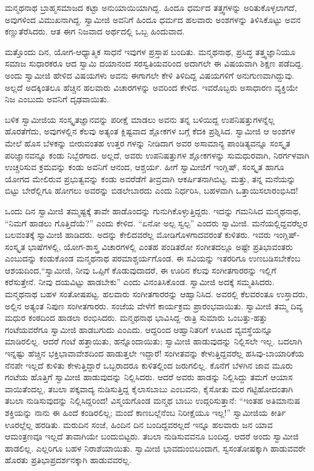ಮನ್ಮಥನಾಥ ಬ್ರಾಹ್ಮಸಮಾಜದ ಕಟ್ಟಾ ಅನುಯಾಯಿಯಾಗಿದ್ದ. ಹಿಂದೂ ಧರ್ಮದ ತತ್ತ್ವಗಳನ್ನು ಅರಿತುಕೊಳ್ಳಲಾಗದೆ, ಅವುಗಳಿಂದ ವಿಮುಖನಾಗಿದ್ದ. ಸ್ವಾಮೀಜಿ ಅವನಿಗೆ ಹಿಂದೂ ಧರ್ಮದ ಹಲವಾರು ಅಂಶಗಳನ್ನು ತಿಳಿಸಿಕೊಟ್ಟು ಅವನ ಕಣ್ಣುತೆರೆಸಿದರು. ಆತ ಈಗ ನಿಜವಾದ ಅರ್ಥದಲ್ಲಿ ಒಬ್ಬ ಹಿಂದುವಾದ.

ಮತ್ತೊಂದು ದಿನ, ಯೋಗ-ಆಧ್ಯಾತ್ಮಿಕ ಸಾಧನೆ ಇವುಗಳ ಪ್ರಸ್ತಾಪ ಬಂದಿತು. ಮನ್ಮಥನಾಥ, ಪ್ರಸಿದ್ಧ ತತ್ತ್ವಜ್ಞಾನಿಯೂ ಸಮಾಜ ಸುಧಾರಕರೂ ಆದ ಸ್ವಾಮಿ ದಯಾನಂದ ಸರಸ್ವತಿಯವರಿಂದ ಅದಾಗಲೇ ಈ ವಿಷಯವಾಗಿ ಶಿಕ್ಷಣ ಪಡೆದಿದ್ದ. ಅಂದು ಸ್ವಾಮೀಜಿ ಹೇಳಿದ ವಿಷಯಗಳು ಅವನು ಈಗಾಗಲೇ ಕೇಳಿ ತಿಳಿದಿದ್ದ ವಿಷಯಗಳಿಗೆ ಅನುಗುಣವಾಗಿದ್ದುವು. ಅಲ್ಲದೆ ಅದಕ್ಕಿಂತಲೂ ಹೆಚ್ಚಿನ ಹಲವಾರು ವಿಚಾರಗಳನ್ನು ಅವರಿಂದ ಕೇಳಿದ. ಇವರೊಬ್ಬರು ಅಸಾಧಾರಣ ವ್ಯಕ್ತಿಯೇ ನಿಜ ಎಂಬುದು ಅವನಿಗೆ ದೃಢವಾಯಿತು.

ಬಳಿಕ ಸ್ವಾಮೀಜಿಯ ಸಂಸ್ಕೃತಜ್ಞಾನವನ್ನು ಪರೀಕ್ಷೆ ಮಾಡಲು ಅವನು ತನ್ನ ಬಳಿಯಿದ್ದ ಉಪನಿಷತ್ತುಗಳನ್ನೆಲ್ಲ ಹೊರತೆಗೆದು, ಅವುಗಳಲ್ಲಿನ ಕೆಲವು ಅತ್ಯಂತ ಕ್ಲಿಷ್ಟವಾದ ಶ್ಲೋಕಗಳ ಬಗ್ಗೆ ಕೆದಕಿ ಪ್ರಶ್ನಿಸಿದ. ಸ್ವಾಮೀಜಿ ಆ ಅಂಶಗಳ ಮೇಲೆ ಹೊಸ ಬೆಳಕನ್ನು ಬೀರುವಂತಹ ಉತ್ತರ ಗಳನ್ನು ನೀಡಿದಾಗ ಅವರ ಅಸಾಮಾನ್ಯ ಪಾಂಡಿತ್ಯವನ್ನೂ ಸಂಸ್ಕೃತ ಪರಿಜ್ಞಾನವನ್ನೂ ಕಂಡು ನಿಬ್ಬೆರಗಾದ. ಅಲ್ಲದೆ, ಅವರು ಉಪನಿಷತ್ತುಗಳ ಶ್ಲೋಕಗಳನ್ನು ಸುಮಧುರವಾಗಿ, ನಿರರ್ಗಳವಾಗಿ ಉಚ್ಚರಿಸುವ ಕ್ರಮವನ್ನು ಕಂಡು ಅವನಿಗೆ ಆನಂದ, ಆಶ್ಚರ್ಯ. ಹೀಗೆ ಸ್ವಾಮೀಜಿಗೆ ಇಂಗ್ಲಿಷ್, ಸಂಸ್ಕೃತ ಹಾಗೂ ಯೋಗದ ಮೇಲಿರುವ ಪ್ರಭುತ್ವವನ್ನು ಕಂಡು ಅವರೆಡೆಗೆ ತೀವ್ರವಾಗಿ ಆಕರ್ಷಿತನಾಗಿಬಿಟ್ಟ. ಮತ್ತು, ತನ್ನ ಮನೆಯನ್ನು ಬಿಟ್ಟು ಬೇರೆಲ್ಲಿಗೂ ಹೋಗಲು ಅವರನ್ನು ಬಿಡಲೇಬಾರದು ಎಂದು ನಿರ್ಧರಿಸಿ, ಬಹಳವಾಗಿ ಒತ್ತಾಯಿಸಲಾರಂಭಿಸಿದ!

ಒಂದು ದಿನ ಸ್ವಾಮೀಜಿ ತಮ್ಮಷ್ಟಕ್ಕೆ ತಾವೇ ಹಾಡೊಂದನ್ನು ಗುನುಗಿಕೊಳ್ಳುತ್ತಿದ್ದರು. ಇದನ್ನು ಗಮನಿಸಿದ ಮನ್ಮಥನಾಥ, “ನಿಮಗೆ ಹಾಡಲು ಗೊತ್ತಿದೆಯೆ?” ಎಂದು ಕೇಳಿದ. “ಏನೋ ಅಲ್ಪ ಸ್ವಲ್ಪ” ಎಂದರು ಸ್ವಾಮೀಜಿ. ಮನೆಯಲ್ಲಿದ್ದವರೆಲ್ಲರ ಬಲವಂತಕ್ಕೆ ಸ್ವಾಮೀಜಿ ಹಾಡಿದರು. ಅದನ್ನು ಕೇಲಿದವರೆಲ್ಲ ಮೋಡಿಗೊಳಗಾದವರಂತೆ ಕುಳಿತರು. ಇವರು ಇಂಗ್ಲಿಷ್-ಸಂಸ್ಕೃತ ಭಾಷೆಗಳಲ್ಲಿ, ಯೋಗ-ಶಾಸ್ತ್ರ ವಿಚಾರಗಳಲ್ಲಿ ಎಂತಹ ಪಂಡಿತರೋ ಸಂಗೀತದಲ್ಲೂ ಅಷ್ಟೇ ಪ್ರತಿಭಾವಂತರು ಎಂಬುದನ್ನು ಕಂಡುಕೊಂಡ ಮನ್ಮಥನಾಥ ಪರಮಾಶ್ಚರ್ಯಗೊಂಡ. ಈ ಸವಿಯನ್ನು ಇತರರಿಗೂ ಉಣಬಡಿಸಬೇಕೆಂಬ ಆಶಯದಿಂದ,“ಸ್ವಾಮೀಜಿ, ನೀವು ಒಪ್ಪಿಗೆ ಕೊಡುವುದಾದರೆ, ಈ ಊರಿನ ಕೆಲವು ಸಂಗೀತಗಾರರನ್ನು ಇಲ್ಲಿಗೆ ಕರೆಸುತ್ತೇನೆ. ನೀವು ದಯವಿಟ್ಟು ಹಾಡಬೇಕು” ಎಂದು ವಿನಂತಿಸಿಕೊಂಡ. ಸ್ವಾಮೀಜಿ ಅದಕ್ಕೆ ಸಮ್ಮತಿಸಿದರು. ಮನ್ಮಥನಾಥ ಬಹಳ ಸಂತೋಷಪಟ್ಟ. ಹಲವಾರು ಸಂಗೀತಗಾರರನ್ನು ಆಹ್ವಾನಿಸಿದ. ಅವರಲ್ಲಿ ಕೆಲವರಂತೂ ಉಸ್ತಾದರು, ಅಲ್ಲಿನ ಅತ್ಯಂತ ನಿಪುಣ ಸಂಗೀತಗಾರರು. ಸಂಜೆಯ ವೇಳೆಗೆ ಕಾರ್ಯಕ್ರಮ ಪ್ರಾರಂಭವಾಯಿತು. ಸ್ವಾಮೀಜಿ ತಮ್ಮ ದಿವ್ಯ ಮಧುರ ಕಂಠದಿಂದ ಹಾಡಲಾ ರಂಭಿಸಿದರು. ಮನ್ಮಥನಾಥ ಭಾವಿಸಿದ್ದ–ರಾತ್ರಿ ಸುಮಾರು ಒಂಬತ್ತು-ಹತ್ತು ಗಂಟೆಯವರೆಗೂ ಸ್ವಾಮೀಜಿ ಹಾಡಬಗುದು ಎಂಎದು. ಆದ್ದರಿಂದ ಆಹ್ವಾನಿತರಿಗೆ ಊಟದ ವ್ಯವಸ್ಥೆಯನ್ನೂ ಮಾಡಿರಲಿಲ್ಲ. ಆದರೆ ಗಂಟೆ ಹತ್ತಾಯಿತು, ಹನ್ನೊಂದಾಯಿತು; ಸ್ವಾಮೀಜಿ ಹಾಡುವುದನ್ನು ನಿಲ್ಲಿಸಲೇ ಇಲ್ಲ. ಬದಲಾಗಿ ಇನ್ನಷ್ಟು ಹೆಚ್ಚಿನ ಭಕ್ತಿಭಾವಾವೇಶದಿಂದ ಹಾಡುತ್ತಲೇ ಇದ್ದಾರೆ! ಸಂಗೀತವನ್ನು ಕೇಳುತ್ತಿದ್ದವರೆಲ್ಲ ಹಸಿವು-ಬಾಯಾರಿಕೆಯ ನೆನಪೇ ಇಲ್ಲದೆ ಕುಳಿತು ಕೇಳುತ್ತಿದ್ದಾರೆ ಒಬ್ಬರಾದರೂ ಕುಳಿತಲ್ಲಿಂದ ಜರುಗಲಿಲ್ಲ. ಕೊನೆಗೆ ಬೆಳಗಿನ ಜಾವ ಮೂರು ಗಂಟೆಯ ಹೊತ್ತಿಗೆ ಸ್ವಾಮೀಜಿ ಹಾಡುವುದನ್ನು ನಿಲ್ಲಿಸಿದರು. ಆದರೆ ಅವರು ಹಾಡನ್ನು ನಿಲ್ಲಿಸಿದ್ದು ತಮಗೆ ಆಯಾಸ ವಾಯಿತೆಂದಲ್ಲ, ತಬಲಾ ಪಕ್ಕವಾದ್ಯ ನುಡಿಸುತ್ತಿದ್ದ ಕೈಲಾಸಬಾಬು ಎಂಬವನು, ಕೈಸೋತು ಮರ ಗಟ್ಟಿಹೋದಂತಾಗಿ ತಬಲಾ ನುಡಿಸುವುದನ್ನು ನಿಲ್ಲಿಸಿದ್ದರಿಂದ! ವಿಸ್ಮಯಗೊಂಡ ಮನ್ಮಥ ಬಾಬು ಉದ್ಗರಿಸುತ್ತಾನೆ: “ಇಂತಹ ಅತಿಮಾನುಷ ಶಕ್ತಿಯನ್ನು ನಾನು ಈ ಹಿಂದೆ ಕಂಡಿರಲಿಲ್ಲ; ಮಂದೆ ಕಾಣಬಲ್ಲೆನೆಂಬ ನಿರೀಕ್ಷೆಯೂ ಇಲ್ಲ!” ಸ್ವಾಮೀಜಿಯ ಕೀರ್ತಿ ಊರಲ್ಲೆಲ್ಲ ಹರಡಿತು. ಮರುದಿನ ಸಂಜೆ, ಹಿಂದಿನ ದಿನ ಬಂದಿದ್ದವರಲ್ಲದೆ ಇನ್ನೂ ಹಲವಾರು ಜನ ಯಾವ ಆಮಂತ್ರಣವೂ ಇಲ್ಲದೆ ತಾವಾಗಿಯೇ ಬಂದುಬಿಟ್ಟರು. ತಬಲಾ ನುಡಿಸುವವನೂ ಬಂದಿದ್ದ. ಆದರೆ ಅಂದು ಸ್ವಾಮೀಜಿ ಹಾಡಲಿಲ್ಲ. ಎಲ್ಲರಿಗೂ ಬಹಳ ನಿರಾಶೆಯಾಯಿತು. ಸ್ವಾಮೀಜಿ ಭಾವದುಂಬಿಬಂದಾಗ, ಸ್ವಸಂತೋಷಕ್ಕಾಗಿ ಹಾಡುವವರೇ ಹೊರತು ಪ್ರತಿಭಾಪ್ರದರ್ಶನಕ್ಕಾಗಿ ಹಾಡುವವರಲ್ಲ. 

